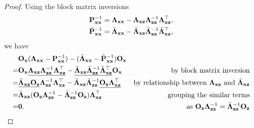 \begin{proof}%


Using the block matrix inversions
\begin{equation*}
\begin{split}
{\bf P}_{\bf xx}^{-1}&={\bf \Lambda}_{\bf xx}-{\bf \Lambda}_{\bf xz}{\bf \Lambda}_{\bf zz}^{-1}{\bf \Lambda}_{\bf xz}^\top, \\
\tilde{\bf P}_{\bf xx}^{-1}&=\tilde{\bf \Lambda}_{\bf xx}-\tilde{\bf \Lambda}_{\bf xz}\tilde{\bf \Lambda}_{\bf zz}^{-1}\tilde{\bf \Lambda}_{\bf xz}^\top,\\
\end{split}
\end{equation*}
we have
\begin{align*}
&{\bf O}_{\bf x}({\bf \Lambda}_{\bf xx}-{\bf P}_{\bf xx}^{-1})-(\tilde{\bf \Lambda}_{\bf xx}-\tilde{\bf P}_{\bf xx}^{-1}){\bf O}_{\bf x} & \\
=&{\bf O}_{\bf x}\underline{{\bf \Lambda}_{\bf xz}{\bf \Lambda}_{\bf zz}^{-1}{\bf \Lambda}_{\bf xz}^\top}-\underline{\tilde{\bf \Lambda}_{\bf xz}\tilde{\bf \Lambda}_{\bf zz}^{-1}\tilde{\bf \Lambda}_{\bf xz}^\top}{\bf O}_{\bf x} & \textrm{by block matrix inversion}\\
=&\underline{\tilde{\bf \Lambda}_{\bf xz}{\bf O}_{\bf z}}{\bf \Lambda}_{\bf zz}^{-1}{\bf \Lambda}_{\bf xz}^\top-\tilde{\bf \Lambda}_{\bf xz}\tilde{\bf \Lambda}_{\bf zz}^{-1}\underline{{\bf O}_{\bf z}{\bf \Lambda}_{\bf xz}^\top} & \textrm{by relationship between ${\bf \Lambda}_{\bf xz}$ and $\tilde{\bf \Lambda}_{\bf xz}$}\\
=&\tilde{\bf \Lambda}_{\bf xz}({\bf O}_{\bf z}{\bf \Lambda}_{\bf zz}^{-1}-\tilde{\bf \Lambda}_{\bf zz}^{-1}{\bf O}_{\bf z}){\bf \Lambda}_{\bf xz}^\top & \textrm{grouping the similar terms}\\
=&\bf 0. & \textrm{as ${\bf O}_{\bf z}{\bf \Lambda}_{\bf zz}^{-1}=\tilde{\bf \Lambda}_{\bf zz}^{-1}{\bf O}_{\bf z}$}\\
\end{align*}

\end{proof}
